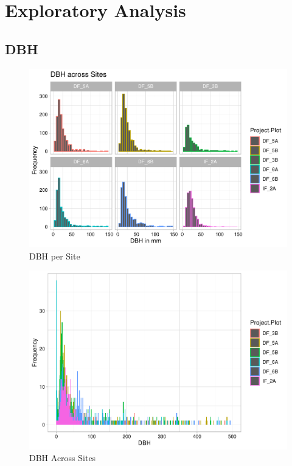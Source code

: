 \documentclass[
  12pt,
]{article}
\begin{document}
\newpage

\hypertarget{exploratory-analysis}{%
\section{Exploratory Analysis}\label{exploratory-analysis}}

\hypertarget{dbh}{%
\subsection{DBH}\label{dbh}}

\begin{figure}
\centering
\includegraphics{GoldenGriffithsKnierMalinowski_ENV872_Project_files/figure-latex/unnamed-chunk-5-1.pdf}
\caption{DBH per Site}
\end{figure}

\begin{figure}
\centering
\includegraphics{GoldenGriffithsKnierMalinowski_ENV872_Project_files/figure-latex/unnamed-chunk-7-1.pdf}
\caption{DBH Across Sites}
\end{figure}
\end{document}
